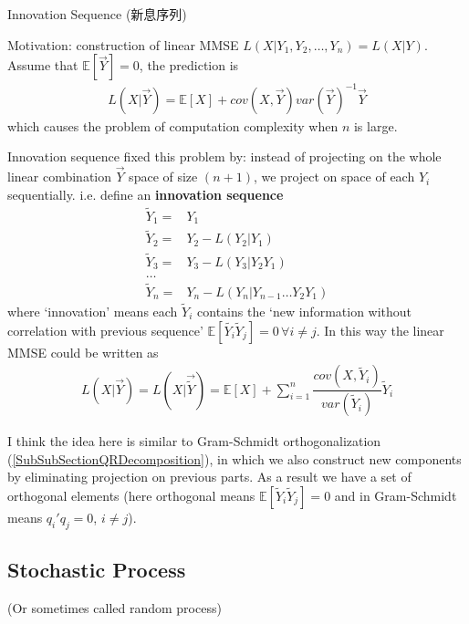 \begin{point}
    Innovation Sequence (新息序列)
\end{point}

Motivation: construction of linear MMSE $ L(X|Y_1,Y_2,\ldots,Y_n)=L(X|Y) $. Assume that $\mathbb{E}\left[ \vec{Y} \right] =0 $, the prediction is
\begin{align*}
    L(X|\vec{Y})=\mathbb{E}\left[ X \right] + cov(X,\vec{Y})var(\vec{Y})^{-1}\vec{Y}
\end{align*}
which causes the problem of computation complexity when $ n $ is large. 

Innovation sequence fixed this problem by: instead of projecting on the whole linear combination $ \vec{Y} $ space of size $ (n+1) $, we project on space of each $ Y_i $ sequentially. i.e. define an \textbf{innovation sequence} 
\begin{align*}
    \tilde{Y}_1=&Y_1\\
    \tilde{Y}_2=&Y_2-L(Y_2|Y_1)\\
    \tilde{Y}_3=&Y_3-L(Y_3|Y_2Y_1)\\
    \ldots&\\
    \tilde{Y}_n=&Y_n-L(Y_n|Y_{n-1}\ldots Y_2Y_1)
\end{align*}
where `innovation' means each $ \tilde{Y}_i $ contains the `new information without correlation with previous sequence' $ \mathbb{E}\left[ \tilde{Y_i}\tilde{Y}_j \right]=0\,\forall i\neq j  $. In this way the linear MMSE could be written as
\begin{align*}
    L(X|\vec{Y})=L(X|\vec{\tilde{Y}})= \mathbb{E}\left[ X \right] +\sum_{i=1}^n \dfrac{cov(X,\tilde{Y}_i)}{var(\tilde{Y}_i)}\tilde{Y}_i
\end{align*}

I think the idea here is similar to Gram-Schmidt orthogonalization (\autoref{SubSubSectionQRDecomposition}), in which we also construct new components by eliminating projection on previous parts. As a result we have a set of orthogonal elements (here orthogonal means $ \mathbb{E}\left[ \tilde{Y}_i\tilde{Y}_j \right]=0  $ and in Gram-Schmidt means $ q_i'q_j = 0 $, $ i\neq j $).






\subsection{Stochastic Process}
(Or sometimes called random process)

